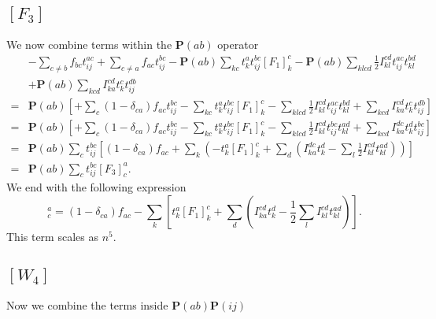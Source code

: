 \documentclass[a4paper,norsk,11pt,twoside]{report}
\begin{document}
\subsection{$[F_3]$}
We now combine terms within the $\textbf{P}(ab)$ operator
\begin{align}
& - \sum_{c \not= b} f_{bc} t_{ij}^{ac}
+ \sum_{c \not= a} f_{ac} t_{ij}^{bc}
- \textbf{P}(ab) \sum_{kc} t_k^a t_{ij}^{bc} [F_1]_k^c
- \textbf{P}(ab) \sum_{klcd} \frac{1}{2} I_{kl}^{cd} t_{ij}^{ac} t_{kl}^{bd}
\nonumber \\ &
+ \textbf{P}(ab) \sum_{kcd} I_{ka}^{cd} t_k^c t_{ij}^{db} \nonumber \\
= &
\textbf{P}(ab) \left[
+ \sum_c (1-\delta_{ca}) f_{ac} t_{ij}^{bc}
- \sum_{kc} t_k^a t_{ij}^{bc} [F_1]_k^c
- \sum_{klcd} \frac{1}{2} I_{kl}^{cd} t_{ij}^{ac} t_{kl}^{bd}
+ \sum_{kcd} I_{ka}^{cd} t_k^c t_{ij}^{db} 
\right]
\nonumber \\
= &
\textbf{P}(ab) \left[
+ \sum_c (1-\delta_{ca}) f_{ac} t_{ij}^{bc}
- \sum_{kc} t_k^a t_{ij}^{bc} [F_1]_k^c
- \sum_{klcd} \frac{1}{2} I_{kl}^{cd} t_{ij}^{bc} t_{kl}^{ad}
+ \sum_{kcd} I_{ka}^{dc} t_k^d t_{ij}^{bc} 
\right]
\nonumber \\
= &
\textbf{P}(ab) \sum_c t_{ij}^{bc}
\left[
(1-\delta_{ca}) f_{ac}
+ \sum_{k} \left( - t_k^a [F_1]_k^c
+ \sum_{d} \left( I_{ka}^{dc} t_k^d 
- \sum_{l} \frac{1}{2} I_{kl}^{cd} t_{kl}^{ad} \right) \right)
\right] \nonumber \\
= &
\textbf{P}(ab) \sum_c t_{ij}^{bc} [F_3]_c^a .
\end{align}
We end with the following expression
\begin{equation}
[F_3]_c^a = (1-\delta_{ca}) f_{ac}
- \sum_{k} \left[ t_k^a [F_1]_k^c
+ \sum_{d} \left( I_{ka}^{cd} t_k^d 
- \frac{1}{2} \sum_{l} I_{kl}^{cd} t_{kl}^{ad} \right) \right] . \label{intermedF3}
\end{equation}
This term scales as $n^5$.

\subsection{$[W_4]$}
Now we combine the terms inside $\textbf{P}(ab) \textbf{P}(ij)$
\end{document}
